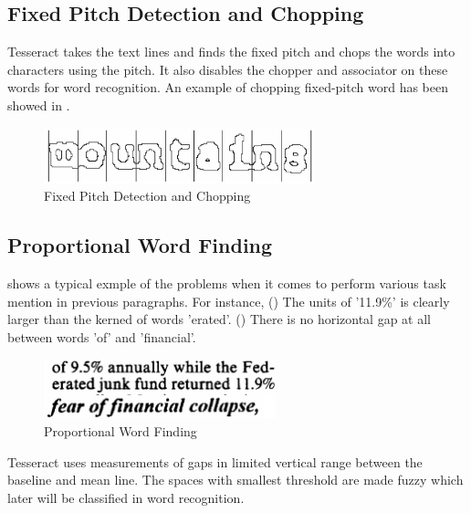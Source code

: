 \subsection{Fixed Pitch Detection and Chopping}

Tesseract takes the text lines and finds the fixed pitch and chops the words into characters using the pitch. It also disables the chopper and associator on these words for word recognition. An example of chopping fixed-pitch word has been showed in .

\begin{figure}[!ht]
    \centering
    \includegraphics[width=0.7\textwidth]{chapters/images/OCR/Fixed_Pitch_detection.JPG}
    \caption{Fixed Pitch Detection and Chopping\cite{AnOverviewoftheTesseractOCREngine}}
    \label{fig:Fixed_Pitch_detection}
\end{figure}

\subsection{Proportional Word Finding}

 shows a typical exmple of the problems when it comes to perform various task mention in previous paragraphs. For instance, () The units of '11.9\%' is clearly larger than the kerned of words 'erated'. () There is no horizontal gap at all between words 'of' and 'financial'.

\begin{figure}[ht]
    \centering
    \includegraphics[width=0.6\textwidth]{chapters/images/OCR/Word_Finding.JPG}
    \caption{Proportional Word Finding\cite{AnOverviewoftheTesseractOCREngine}}
    \label{fig:Proportional_Word_Finding}
\end{figure}

Tesseract uses measurements of gaps in limited vertical range between the baseline and mean line. The spaces with smallest threshold are made fuzzy which later will be classified in word recognition.



